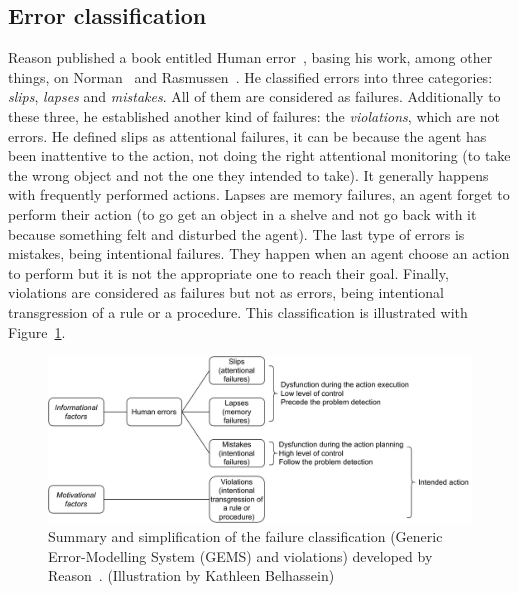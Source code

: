 \documentclass[a4paper,11pt,twoside]{StyleThese}
\begin{document}
\subsection{Error classification}
Reason published a book entitled Human error~\cite{reason_1990_human}, basing his work, among other things, on Norman~\cite{norman_1981_categorization} and Rasmussen~\cite{rasmussen_1982_human}. He classified errors into three categories: \emph{slips}, \emph{lapses} and \emph{mistakes}. All of them are considered as failures. Additionally to these three, he established another kind of failures: the \emph{violations}, which are not errors. He defined slips as attentional failures, \ie it can be because the agent has been inattentive to the action, not doing the right attentional monitoring (\eg to take the wrong object and not the one they intended to take). It generally happens with frequently performed actions. Lapses are memory failures, \ie an agent forget to perform their action (\eg to go get an object in a shelve and not go back with it because something felt and disturbed the agent). The last type of errors is mistakes, being intentional failures. They happen when an agent choose an action to perform but it is not the appropriate one to reach their goal. Finally, violations are considered as failures but not as errors, being intentional transgression of a rule or a procedure. This classification is illustrated with Figure~\ref{chap1:fig:err}.

 \begin{figure}[!ht]
 	\includegraphics[width=\linewidth]{figures/chapter1/reason-errors.pdf}
 	\caption{Summary and simplification of the failure classification (Generic Error-Modelling System (GEMS) and violations) developed by Reason~\cite{reason_1990_human}. (Illustration by Kathleen Belhassein)}
 	\label{chap1:fig:err}
 \end{figure}
\end{document}
